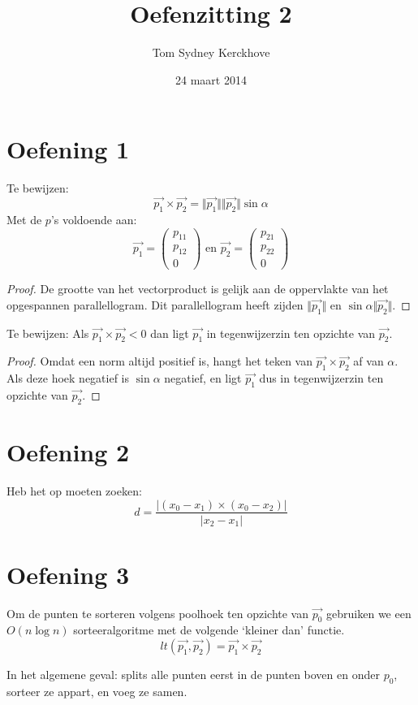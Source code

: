 \documentclass[10pt,a4paper]{article}
\title{Oefenzitting 2}
\author{Tom Sydney Kerckhove}
\date{24 maart 2014}
\begin{document}
\maketitle


\section*{Oefening 1}
Te bewijzen:
\[
\vec{p_1}\times\vec{p_2}
= \Vert\vec{p_1}\Vert\Vert\vec{p_2}\Vert\sin\alpha
\]
Met de $p$'s voldoende aan:
\[
\vec{p_1} = \begin{pmatrix}
p_{11}\\p_{12}\\0
\end{pmatrix}
\text{ en }
\vec{p_2} = \begin{pmatrix}
p_{21}\\p_{22}\\0
\end{pmatrix}
\]

\begin{proof}
De grootte van het vectorproduct is gelijk aan de oppervlakte van het opgespannen parallellogram. Dit parallellogram heeft zijden $\Vert \vec{p_1}\Vert$ en $\sin\alpha\Vert \vec{p_2}\Vert$.
\end{proof}


\noindent Te bewijzen: Als $\vec{p_1}\times\vec{p_2} <0$  dan ligt $\vec{p_1}$ in tegenwijzerzin ten opzichte van $\vec{p_2}$.
\begin{proof}
Omdat een norm altijd positief is, hangt het teken van $\vec{p_1}\times\vec{p_2}$ af van $\alpha$. Als deze hoek negatief is $\sin\alpha$ negatief, en ligt $\vec{p_1}$ dus in tegenwijzerzin ten opzichte van $\vec{p_2}$.
\end{proof}

\section*{Oefening 2}
Heb het op moeten zoeken:
\[
d = \frac{|(x_0-x_1)\times(x_0-x_2)|}{|x_2-x_1|}
\]

\section*{Oefening 3}
Om de punten te sorteren volgens poolhoek ten opzichte van $\vec{p_0}$ gebruiken we een $O(n\log n)$ sorteeralgoritme met de volgende `kleiner dan' functie.
\[
lt(\vec{p_1},\vec{p_2}) = \vec{p_1}\times\vec{p_2}
\]

In het algemene geval: splits alle punten eerst in de punten boven en onder $p_0$, sorteer ze appart, en voeg ze samen.
\end{document}
